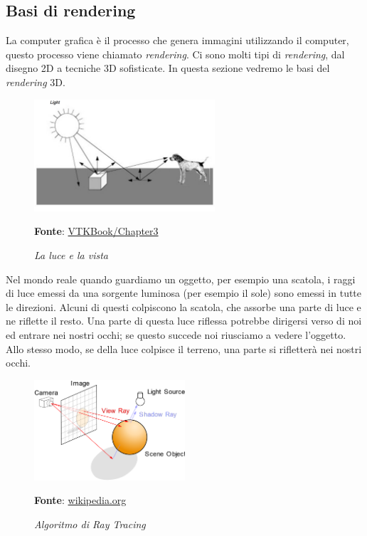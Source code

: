 \subsection{Basi di rendering}\label{sec:basi-rendering}
La computer grafica è il processo che genera immagini utilizzando il computer, questo processo viene chiamato \emph{rendering}. Ci sono molti tipi di \emph{rendering}, dal disegno 2D a tecniche 3D sofisticate. In questa sezione vedremo le basi del \emph{rendering} 3D.

\begin{figure}[h]
    \centering
    \includegraphics[width=0.6\textwidth]{immagini/volumerendering/lightpropagation.png}
    \caption{\textit{La luce e la vista}}
    \textbf{Fonte}: \href{https://lorensen.github.io/VTKExamples/site/VTKBook/03Chapter3/}{VTKBook/Chapter3}
    \label{fig: Propagazione della luce}
\end{figure}

Nel mondo reale quando guardiamo un oggetto, per esempio una scatola, i raggi di luce emessi da una sorgente luminosa (per esempio il sole) sono emessi in tutte le direzioni. Alcuni di questi colpiscono la scatola, che assorbe una parte di luce e ne riflette il resto. Una parte di questa luce riflessa potrebbe dirigersi verso di noi ed entrare nei nostri occhi; se questo succede noi riusciamo a vedere l'oggetto. Allo stesso modo, se della luce colpisce il terreno, una parte si rifletterà nei nostri occhi.

\begin{figure}[h]
    \centering
    \includegraphics[width=0.5\textwidth]{immagini/volumerendering/ray_tracing_diagram.png}
    \caption{\textit{Algoritmo di Ray Tracing}}
    \textbf{Fonte}: \href{https://en.wikipedia.org/wiki/Ray_tracing_(graphics)}{wikipedia.org}
    \label{fig: Algoritmo di Ray Tracing}
\end{figure}

